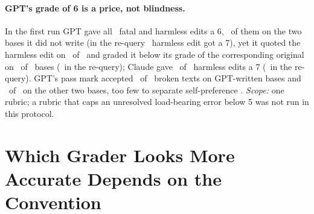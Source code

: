 \documentclass{article}
\begin{document}
\paragraph{GPT's grade of 6 is a price, not blindness.} In the first run GPT gave all \CRGPTFlatSixP\ fatal and harmless edits a 6, \CRGPTNonGptFlatP\ of them on the two bases it did not write (in the re-query \CRGPTHSevenR\ harmless edit got a 7), yet it quoted the harmless edit on \CRGPTHQuoteP\ of \CRNPerClass\ and graded it below its grade of the corresponding original on \CRGPTHBelowOrigP\ of \CRNBases\ bases (\CRGPTHBelowOrigR\ in the re-query); Claude gave \CRClaudeHSevenP\ of \CRNPerClass\ harmless edits a 7 (\CRClaudeHSevenR\ in the re-query). GPT's pass mark accepted \CRGPTPassBrokenAccGptBasesP\ of \CRNBrokenGptBases\ broken texts on GPT-written bases and \CRGPTPassBrokenAccOtherBasesP\ of \CRNBrokenOtherBases\ on the other two bases, too few to separate self-preference \citep{panickssery2024self}. \emph{Scope:} one rubric; a rubric that caps an unresolved load-bearing error below 5 was not run in this protocol.

\begin{table}[t]\centering\small
\caption{What each rule does to each kind of text. Both graders must accept; the rules read one reference-free response. First run, re-query in parentheses where it differs; counts by recorded label (model-written, \S\ref{sec:study}; \CRNDisputedWord\ disputed, all among the pass mark's \CRPassBrokenAccP\ broken accepts), not rates.}
\label{tab:rules}

\end{table}

\section{Which Grader Looks More Accurate Depends on the Convention}
\label{sec:convention}
\end{document}
